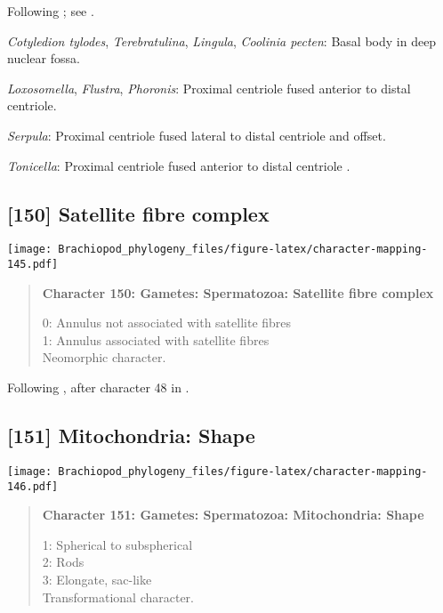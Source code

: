 \documentclass[openany]{book}
\theoremstyle{definition}
\theoremstyle{definition}
\theoremstyle{definition}
\theoremstyle{remark}
\begin{document}
Following \citet{Smith2012}; see \citet{BucklandNicks2008}.

\hypertarget{Coolinia_pecten-coding-149}{}
\emph{Cotyledion tylodes}, \emph{Terebratulina}, \emph{Lingula},
\emph{Coolinia pecten}: Basal body in deep nuclear fossa.

\hypertarget{Flustra-coding-149}{}
\emph{Loxosomella}, \emph{Flustra}, \emph{Phoronis}: Proximal centriole
fused anterior to distal centriole.

\hypertarget{Serpula-coding-149}{}
\emph{Serpula}: Proximal centriole fused lateral to distal centriole and
offset.

\hypertarget{Tonicella-coding-149}{}
\emph{Tonicella}: Proximal centriole fused anterior to distal centriole
\citep{DufresneDube1983}.

\subsection*{{[}150{]} Satellite fibre
complex}\label{satellite-fibre-complex}

\texttt{[image: Brachiopod\_phylogeny\_files/figure-latex/character-mapping-145.pdf]}

\begin{quote}
\textbf{Character 150: Gametes: Spermatozoa: Satellite fibre complex}

0: Annulus not associated with satellite fibres\\
1: Annulus associated with satellite fibres\\
Neomorphic character.
\end{quote}

Following \citet{Smith2012}, after character 48 in \citet{Ponder1997}.

\subsection*{{[}151{]} Mitochondria: Shape}\label{mitochondria-shape}

\texttt{[image: Brachiopod\_phylogeny\_files/figure-latex/character-mapping-146.pdf]}

\begin{quote}
\textbf{Character 151: Gametes: Spermatozoa: Mitochondria: Shape}

1: Spherical to subspherical\\
2: Rods\\
3: Elongate, sac-like\\
Transformational character.
\end{quote}
\end{document}
